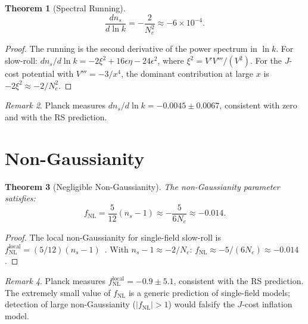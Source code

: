 \documentclass[12pt,a4paper]{article}
\newtheorem{theorem}{Theorem}[section]
\theoremstyle{definition}
\theoremstyle{remark}
\newtheorem{remark}[theorem]{Remark}
\begin{document}
\begin{theorem}[Spectral Running]
\label{thm:running}
\begin{equation}
  \frac{dn_s}{d\ln k} = -\frac{2}{N_e^2}
  \approx -6 \times 10^{-4}.
  \label{eq:running}
\end{equation}
\end{theorem}

\begin{proof}
The running is the second derivative of the power spectrum
in $\ln k$.  For slow-roll:
$dn_s/d\ln k = -2\xi^2 + 16\epsilon\eta - 24\epsilon^2$,
where $\xi^2 = V' V'''/(V^2)$.  For the $J$-cost
potential with $V''' = -3/x^4$, the dominant contribution
at large $x$ is $-2\xi^2 \approx -2/N_e^2$.
\end{proof}

\begin{remark}
Planck measures $dn_s/d\ln k = -0.0045 \pm 0.0067$,
consistent with zero and with the RS prediction.
\end{remark}

\section{Non-Gaussianity}
\label{sec:nongauss}

\begin{theorem}[Negligible Non-Gaussianity]
\label{thm:fNL}
The non-Gaussianity parameter satisfies:
\begin{equation}
  f_{\mathrm{NL}} = \frac{5}{12}(n_s - 1) \approx
  -\frac{5}{6N_e} \approx -0.014.
  \label{eq:fNL}
\end{equation}
\end{theorem}

\begin{proof}
The local non-Gaussianity for single-field slow-roll is
$f_{\mathrm{NL}}^{\mathrm{local}} =
(5/12)(n_s - 1)$~\cite{Maldacena2003}.  With
$n_s - 1 \approx -2/N_e$:
$f_{\mathrm{NL}} \approx -5/(6N_e) \approx -0.014$.
\end{proof}

\begin{remark}
Planck measures
$f_{\mathrm{NL}}^{\mathrm{local}} = -0.9 \pm 5.1$,
consistent with the RS prediction.  The extremely small
value of $f_{\mathrm{NL}}$ is a generic prediction of
single-field models; detection of large non-Gaussianity
($|f_{\mathrm{NL}}| > 1$) would falsify the $J$-cost
inflation model.
\end{remark}
\end{document}
